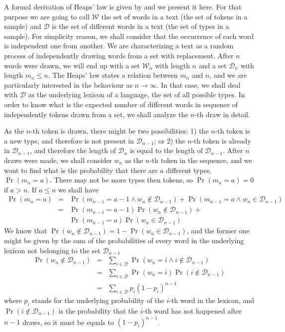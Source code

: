 A formal derivation of Heaps' law is given by \cite{vanLeijenhorst} and we present it here.
For that purpose we are going to call $\mathcal{W}$ the set of words in a text
(the set of tokens in a sample) and $\mathcal{D}$ is the set of different words in
a text (the set of types in a sample). For simplicity reason, we shall consider that
the occurrence of each word is independent one from another. We are characterizing 
a text as a random process of independently drawing words from a set with replacement.
After $n$ words were drawn, we will end up with a set $\mathcal{W}_n$ with length $n$
and a set $\mathcal{D}_n$ with length $m_n \leq n$. The Heaps' law states a relation
between $m_n$ and $n$, and we are particularly interested in the behaviour as $n \rightarrow \infty$.
In that case, we shall deal with $\mathcal{D}$ as the underlying lexicon of a language,
the set of all possible types. In order to know what is the expected number of different
words in sequence of independently tokens drawn from a set, we shall analyze the
$n$-th draw in detail. 

As the $n$-th token is drawn, there might be two possibilities: 1) the $n$-th token
is a new type, and therefore is not present in $\mathcal{D}_{n-1}$; or 2) the $n$-th token
is already in $\mathcal{D}_{n-1}$, and therefore the length of $\mathcal{D}_{n}$ 
is equal to the length of $\mathcal{D}_{n-1}$. After $n$ draws were made, we shall consider
$w_n$ as the $n$-th token in the sequence, and we want to
find what is the probability that there are $a$ different types, $\Pr (m_n = a)$.
There may not be more types then tokens, so $\Pr (m_n = a) = 0$ if $a>n$. 
If $a \leq n$ we shall have
\begin{eqnarray}
\Pr(m_n = a) &=& \Pr(m_{n-1} = a-1 \wedge w_n \notin \mathcal{D}_{n-1}) + 
                 \Pr(m_{n-1} = a \wedge w_n \in \mathcal{D}_{n-1}) \nonumber \\
             &=& \Pr(m_{n-1} = a-1) \Pr(w_n \notin \mathcal{D}_{n-1}) + \nonumber \\
             &&  \Pr(m_{n-1} = a) \Pr(w_n \in \mathcal{D}_{n-1})
\end{eqnarray}
We know that $\Pr(w_n \notin \mathcal{D}_{n-1}) = 1 - \Pr(w_n \in \mathcal{D}_{n-1})$, and the 
former one might be given by the sum of the probabilities of every word in the underlying lexicon
not belonging to the set $\mathcal{D}_{n-1}$
\begin{eqnarray}
\Pr(w_n \notin \mathcal{D}_{n-1}) &=& \sum_{i\in\mathcal{D}} \Pr(w_n = i \wedge i \notin \mathcal{D}_{n-1}) \nonumber \\
                                 &=& \sum_{i\in\mathcal{D}} \Pr(w_n = i) \Pr(i \notin \mathcal{D}_{n-1}) \nonumber \\
                                 &=& \sum_{i\in\mathcal{D}} p_i (1-p_i)^{n-1}
\end{eqnarray}
where $p_i$ stands for the underlying probability of the $i$-th word in the lexicon, and
$\Pr(i \notin \mathcal{D}_{n-1})$ is the probability that the $i$-th word has not happened
after $n-1$ draws, so it must be equals to $(1-p_i)^{n-1}$.

